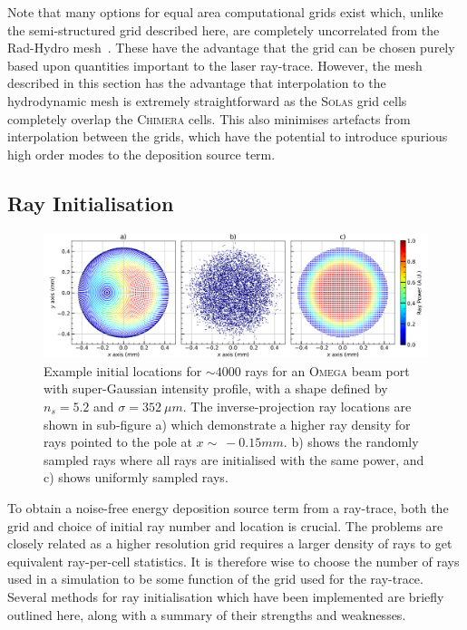 Note that many options for equal area computational grids exist which, unlike the semi-structured grid described here, are completely uncorrelated from the \ac{Rad-Hydro} mesh~\cite{cheong_eigensolutions_2015,malkin_new_2019}.
These have the advantage that the grid can be chosen purely based upon quantities important to the laser ray-trace.
However, the mesh described in this section has the advantage that interpolation to the hydrodynamic mesh is extremely straightforward as the \textsc{Solas} grid cells completely overlap the \textsc{Chimera} cells.
This also minimises artefacts from interpolation between the grids, which have the potential to introduce spurious high order modes to the deposition source term.

\subsection{Ray Initialisation}%
\label{sec:SOLAS_ray_init}

\begin{figure}[t!]
    \includegraphics[width=\linewidth]{Numerics/Images/ray_init_plots.png}
    \centering
    \caption{Example initial locations for $\sim4000$ rays for an \textsc{Omega} beam port with super-Gaussian intensity profile, with a shape defined by $n_s=5.2$ and $\sigma=352\ \mu m$.
    The inverse-projection ray locations are shown in sub-figure a) which demonstrate a higher ray density for rays pointed to the pole at $x\sim\ -0.15 mm$.
    b) shows the randomly sampled rays where all rays are initialised with the same power, and c) shows uniformly sampled rays.}%
    \label{fig:SOLAS_ray_init}
\end{figure}

To obtain a noise-free energy deposition source term from a ray-trace, both the grid and choice of initial ray number and location is crucial.
The problems are closely related as a higher resolution grid requires a larger density of rays to get equivalent ray-per-cell statistics.
It is therefore wise to choose the number of rays used in a simulation to be some function of the grid used for the ray-trace.
Several methods for ray initialisation which have been implemented are briefly outlined here, along with a summary of their strengths and weaknesses.

